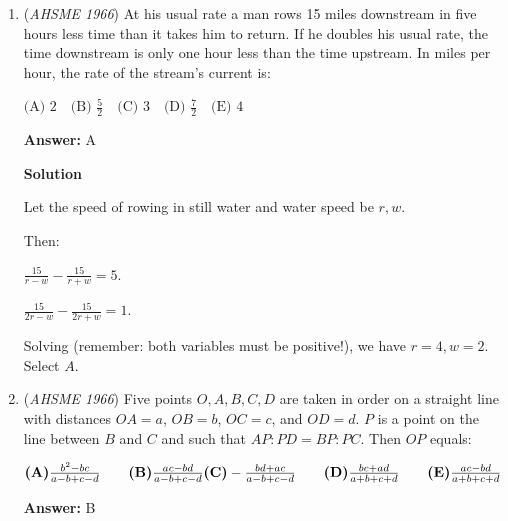 \begin{enumerate}
Substitute the second equation into the first one, we have $13x+11mx-11=700$.

 So $(13+11m)x=711$. So $13+11m$ is a factor of $711$. $711=3*3*79$, so the factors of $711$ are: $1, 3, 9, 79, 237, 711$.

 Clearly, because $m\ge1$, so $13+11m\ge24$. So we only need to check whether $m$ is an integer when $11m+13=79, 237, 711$.

 When $11m+13=79$, $m=6$.

 Checking the other two choices, $m$ dosen't yield to be an integer. So $m=6$ is the only option. Select $\boxed{C}$.

 


	\item (\textit{AHSME 1966}) At his usual rate a man rows 15 miles downstream in five hours less time than it takes him to return. If he doubles his usual rate, the time downstream is only one hour less than the time upstream. In miles per hour, the rate of the stream's current is:


 $\text{(A) } 2 \quad \text{(B) } \frac{5}{2} \quad \text{(C) } 3 \quad \text{(D) } \frac{7}{2} \quad \text{(E) } 4$

 \textbf{Answer: }A



\textbf{Solution}

Let the speed of rowing in still water and water speed be $r, w$. 

 Then: 

 $\frac{15}{r-w}-\frac{15}{r+w}=5$.

 $\frac{15}{2r-w}-\frac{15}{2r+w}=1$.

 Solving (remember: both variables must be positive!), we have $r=4, w=2$. Select $\boxed{A}$.

 


	\item (\textit{AHSME 1966}) Five points $O,A,B,C,D$ are taken in order on a straight line with distances $OA = a$, $OB = b$, $OC = c$, and $OD = d$.  $P$ is a point on the line between $B$ and $C$ and such that $AP: PD = BP: PC$.  Then $OP$ equals:


 $\textbf{(A)} \frac {b^2 - bc}{a - b + c - d} \qquad \textbf{(B)} \frac {ac - bd}{a - b + c - d} \\  \textbf{(C)} - \frac {bd + ac}{a - b + c - d} \qquad \textbf{(D)} \frac {bc + ad}{a + b + c + d} \qquad \textbf{(E)} \frac {ac - bd}{a + b + c + d}$

 \textbf{Answer: }B




\end{enumerate}
